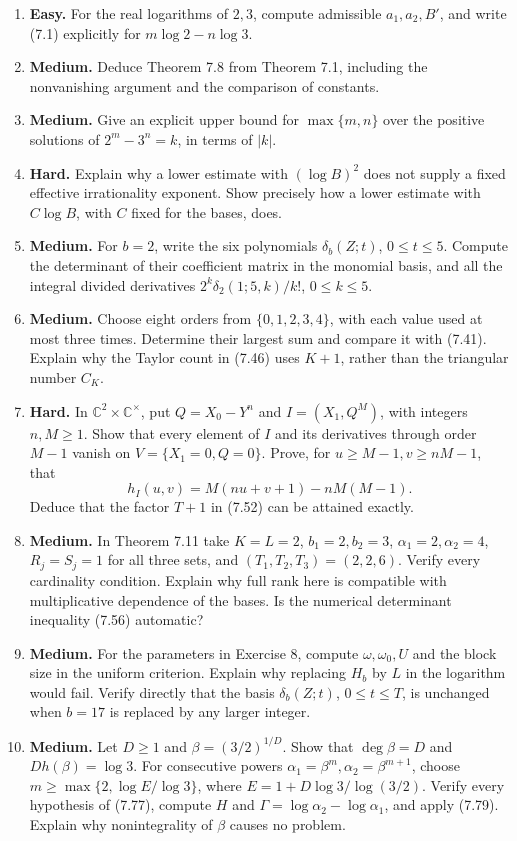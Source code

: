 \documentclass[
  11pt,
  a4paper,
]{article}
\begin{document}
\begin{enumerate}
\def\labelenumi{\arabic{enumi}.}
\item
  \textbf{Easy.} For the real logarithms of \(2,3\), compute admissible
  \(a_1,a_2,B'\), and write (7.1) explicitly for \(m\log2-n\log3\).
\item
  \textbf{Medium.} Deduce Theorem 7.8 from Theorem 7.1, including the
  nonvanishing argument and the comparison of constants.
\item
  \textbf{Medium.} Give an explicit upper bound for \(\max\{m,n\}\) over
  the positive solutions of \(2^m-3^n=k\), in terms of \(|k|\).
\item
  \textbf{Hard.} Explain why a lower estimate with \((\log B)^2\) does
  not supply a fixed effective irrationality exponent. Show precisely
  how a lower estimate with \(C\log B\), with \(C\) fixed for the bases,
  does.
\item
  \textbf{Medium.} For \(b=2\), write the six polynomials
  \(\delta_b(Z;t)\), \(0\le t\le5\). Compute the determinant of their
  coefficient matrix in the monomial basis, and all the integral divided
  derivatives \(2^k\delta_2(1;5,k)/k!\), \(0\le k\le5\).
\item
  \textbf{Medium.} Choose eight orders from \(\{0,1,2,3,4\}\), with each
  value used at most three times. Determine their largest sum and
  compare it with (7.41). Explain why the Taylor count in (7.46) uses
  \(K+1\), rather than the triangular number \(C_K\).
\item
  \textbf{Hard.} In \(\mathbb C^2\times\mathbb C^\times\), put
  \(Q=X_0-Y^n\) and \(I=(X_1,Q^M)\), with integers \(n,M\ge1\). Show
  that every element of \(I\) and its derivatives through order \(M-1\)
  vanish on \(V=\{X_1=0,Q=0\}\). Prove, for \(u\ge M-1,v\ge nM-1\), that
  \[
  h_I(u,v)=M(nu+v+1)-nM(M-1).
  \] Deduce that the factor \(T+1\) in (7.52) can be attained exactly.
\item
  \textbf{Medium.} In Theorem 7.11 take \(K=L=2\), \(b_1=2,b_2=3\),
  \(\alpha_1=2,\alpha_2=4\), \(R_j=S_j=1\) for all three sets, and
  \((T_1,T_2,T_3)=(2,2,6)\). Verify every cardinality condition. Explain
  why full rank here is compatible with multiplicative dependence of the
  bases. Is the numerical determinant inequality (7.56) automatic?
\item
  \textbf{Medium.} For the parameters in Exercise 8, compute
  \(\omega,\omega_0,U\) and the block size in the uniform criterion.
  Explain why replacing \(H_b\) by \(L\) in the logarithm would fail.
  Verify directly that the basis \(\delta_b(Z;t)\), \(0\le t\le T\), is
  unchanged when \(b=17\) is replaced by any larger integer.
\item
  \textbf{Medium.} Let \(D\ge1\) and \(\beta=(3/2)^{1/D}\). Show that
  \(\deg\beta=D\) and \(Dh(\beta)=\log3\). For consecutive powers
  \(\alpha_1=\beta^m,\alpha_2=\beta^{m+1}\), choose
  \(m\ge\max\{2,\log E/\log3\}\), where \(E=1+D\log3/\log(3/2)\). Verify
  every hypothesis of (7.77), compute \(H\) and
  \(\Gamma=\log\alpha_2-\log\alpha_1\), and apply (7.79). Explain why
  nonintegrality of \(\beta\) causes no problem.
\end{enumerate}
\end{document}
